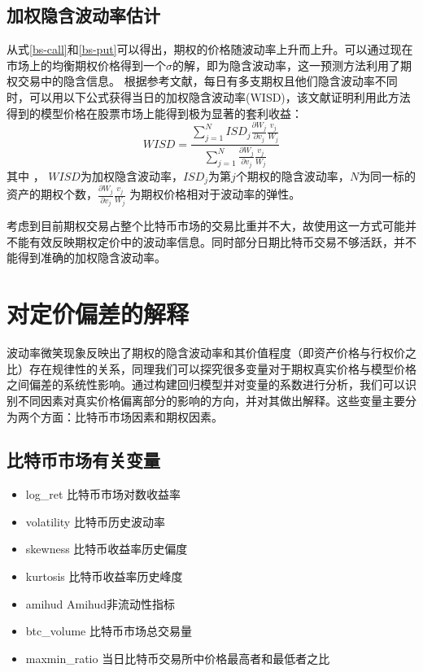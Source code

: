     \subsection{加权隐含波动率估计}
    从式\ref{bs-call}和\ref{bs-put}可以得出，期权的价格随波动率上升而上升。可以通过现在市场上的均衡期权价格得到一个$\sigma$的解，即为隐含波动率，这一预测方法利用了期权交易中的隐含信息。
    根据参考文献\cite{CHIRAS1978213}，每日有多支期权且他们隐含波动率不同时，可以用以下公式获得当日的加权隐含波动率(WISD)，该文献证明利用此方法得到的模型价格在股票市场上能得到极为显著的套利收益：
    \begin{equation}
        WISD=\frac{\sum_{j=1}^{N}{ISD_j\frac{\partial{W_j}}{\partial{v_j}}\frac{v_j}{W_j}}}{\sum_{j=1}^{N}{\frac{\partial{W_j}}{\partial{v_j}}\frac{v_j}{W_j}}}
    \end{equation}
    其中 ， $WISD$为加权隐含波动率，$ISD_j$为第$j$个期权的隐含波动率，$N$为同一标的资产的期权个数，$\frac{\partial{W_j}}{\partial{v_j}}\frac{v_j}{W_j}$ 为期权价格相对于波动率的弹性。
    \par{考虑到目前期权交易占整个比特币市场的交易比重并不大，故使用这一方式可能并不能有效反映期权定价中的波动率信息。同时部分日期比特币交易不够活跃，并不能得到准确的加权隐含波动率。}
    \section{对定价偏差的解释}\label{reg vars}
    波动率微笑现象反映出了期权的隐含波动率和其价值程度（即资产价格与行权价之比）存在规律性的关系，同理我们可以探究很多变量对于期权真实价格与模型价格之间偏差的系统性影响。通过构建回归模型并对变量的系数进行分析，我们可以识别不同因素对真实价格偏离部分的影响的方向，并对其做出解释。这些变量主要分为两个方面：比特币市场因素和期权因素。
    \subsection{比特币市场有关变量}
    \begin{itemize}
        \item log\_ret 比特币市场对数收益率
        \item volatility 比特币历史波动率
        \item skewness 比特币收益率历史偏度
        \item kurtosis 比特币收益率历史峰度
        \item amihud Amihud非流动性指标
        \item btc\_volume 比特币市场总交易量
        \item maxmin\_ratio 当日比特币交易所中价格最高者和最低者之比
    \end{itemize}
    
